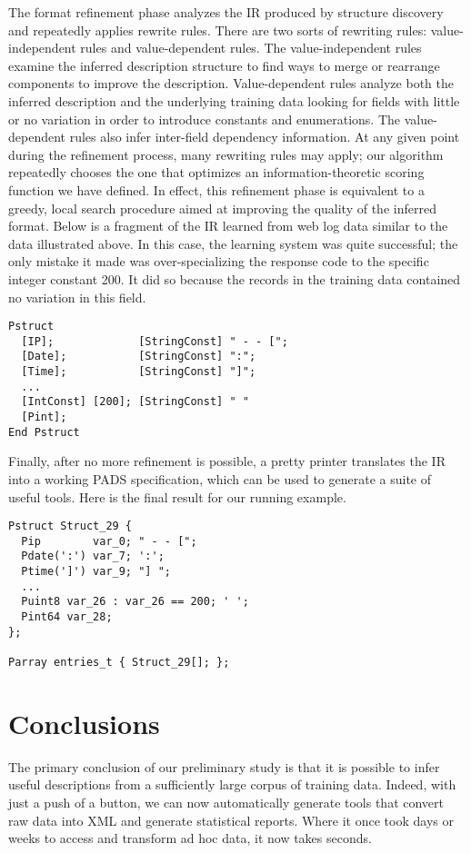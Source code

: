 \documentclass{article}
\begin{document}
The format refinement phase analyzes the IR produced by structure discovery
and repeatedly applies 
rewrite rules.  There are two sorts of rewriting rules: 
value-independent rules and value-dependent rules.
The value-independent rules examine the inferred description structure
to find ways to merge or rearrange components to improve the description.
Value-dependent rules analyze both the inferred description and the underlying
training data looking for fields with little or no 
variation in order to introduce constants and enumerations.
The value-dependent rules also infer
inter-field dependency information.
At any given point during the refinement process,
many rewriting rules may apply; our algorithm repeatedly chooses the one 
that optimizes an information-theoretic
scoring function we have defined.
In effect, this refinement phase is equivalent to a greedy, local search
procedure aimed at improving the quality of the inferred format.
Below is a fragment of the IR learned from web log data similar to the data
illustrated above.  In this case, the learning system was quite successful;  the only mistake it
made was over-specializing the response code 
to the specific integer constant 200.  It did so because the 
records in the training data contained no variation in this field.

{\small
\begin{verbatim}
Pstruct
  [IP];             [StringConst] " - - [";
  [Date];           [StringConst] ":";
  [Time];           [StringConst] "]";
  ...
  [IntConst] [200]; [StringConst] " " 
  [Pint];
End Pstruct
\end{verbatim}
}
Finally, after no more refinement is possible, a pretty printer 
translates the IR into a working PADS 
specification,  which can be used to generate
a suite of useful tools.  Here is the final result for
our running example.

{\small
\begin{verbatim}
Pstruct Struct_29 {
  Pip        var_0; " - - [";
  Pdate(':') var_7; ':';
  Ptime(']') var_9; "] ";
  ...
  Puint8 var_26 : var_26 == 200; ' ';
  Pint64 var_28;
};

Parray entries_t { Struct_29[]; };
\end{verbatim}
}

\section*{Conclusions}
The primary conclusion of our preliminary study 
is that it is possible to infer useful \pads{} descriptions 
from a sufficiently large corpus of training data.  Indeed,
with just a push of a button, we can now automatically generate
tools that convert raw data into XML and generate statistical reports.
Where it once took days or weeks to access and transform ad hoc data, it now
takes seconds.



\end{document}
